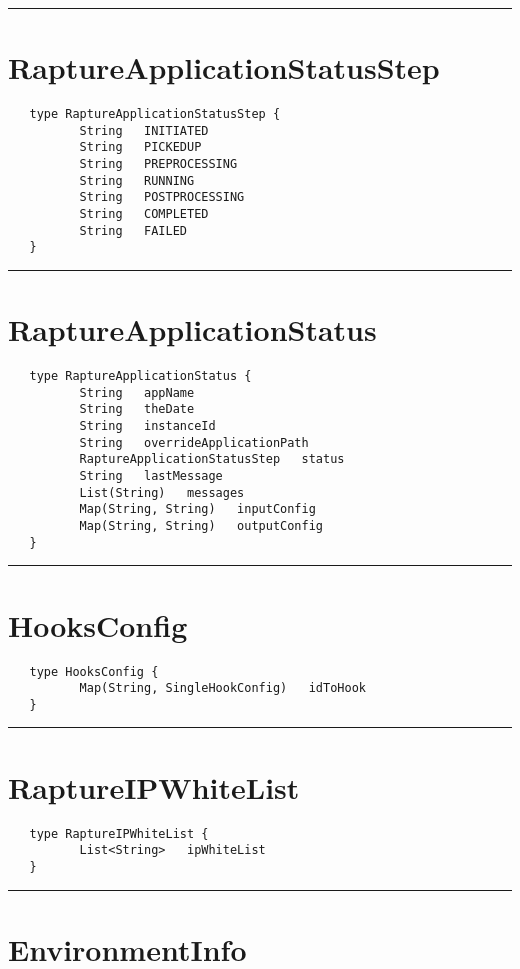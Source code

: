 \rule{15cm}{2pt}
\section{RaptureApplicationStatusStep}
\label{type:RaptureApplicationStatusStep}

\begin{verbatim}
   type RaptureApplicationStatusStep {
          String   INITIATED
          String   PICKEDUP
          String   PREPROCESSING
          String   RUNNING
          String   POSTPROCESSING
          String   COMPLETED
          String   FAILED
   }
\end{verbatim}

\rule{15cm}{2pt}
\section{RaptureApplicationStatus}
\label{type:RaptureApplicationStatus}

\begin{verbatim}
   type RaptureApplicationStatus {
          String   appName
          String   theDate
          String   instanceId
          String   overrideApplicationPath
          RaptureApplicationStatusStep   status
          String   lastMessage
          List(String)   messages
          Map(String, String)   inputConfig
          Map(String, String)   outputConfig
   }
\end{verbatim}

\rule{15cm}{2pt}
\section{HooksConfig}
\label{type:HooksConfig}

\begin{verbatim}
   type HooksConfig {
          Map(String, SingleHookConfig)   idToHook
   }
\end{verbatim}

\rule{15cm}{2pt}
\section{RaptureIPWhiteList}
\label{type:RaptureIPWhiteList}

\begin{verbatim}
   type RaptureIPWhiteList {
          List<String>   ipWhiteList
   }
\end{verbatim}

\rule{15cm}{2pt}
\section{EnvironmentInfo}
\label{type:EnvironmentInfo}


